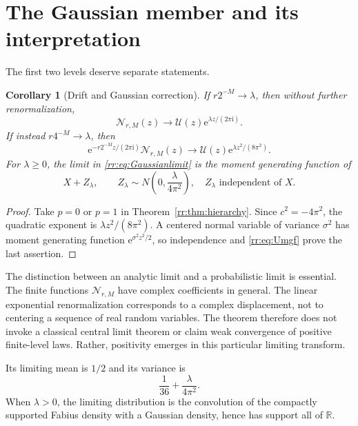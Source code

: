 \documentclass[11pt,a4paper,oneside,openany]{book}
\numberwithin{equation}{chapter}
\newtheorem{corollary}[theorem]{Corollary}
\theoremstyle{definition}
\theoremstyle{remark}
\newcommand{\R}{\mathbb R}
\newcommand{\e}{\mathrm e}
\newcommand{\ii}{\mathrm i}
\newcommand{\Up}{\mathcal U}
\newcommand{\Np}{\mathcal N}
\begin{document}
\section{The Gaussian member and its interpretation}
The first two levels deserve separate statements.

\begin{corollary}[Drift and Gaussian correction]
If \(r2^{-M}\to\lambda\), then without further renormalization,
\begin{equation}
 \Np_{r,M}(z)\longrightarrow\Up(z)\e^{\lambda z/(2\pi\ii)}.
 \label{rr:eq:driftlimit}
\end{equation}
If instead \(r4^{-M}\to\lambda\), then
\begin{equation}
 \e^{-r2^{-M}z/(2\pi\ii)}\Np_{r,M}(z)
 \longrightarrow\Up(z)\e^{\lambda z^2/(8\pi^2)}.
 \label{rr:eq:Gaussianlimit}
\end{equation}
For \(\lambda\geq0\), the limit in \eqref{rr:eq:Gaussianlimit} is the moment generating function of
\begin{equation}
 X+Z_\lambda,\qquad
 Z_\lambda\sim N\left(0,\frac{\lambda}{4\pi^2}\right),
 \quad Z_\lambda\text{ independent of }X.
 \label{rr:eq:Gaussianlaw}
\end{equation}
\end{corollary}
\begin{proof}
Take \(p=0\) or \(p=1\) in Theorem~\ref{rr:thm:hierarchy}. Since \(c^2=-4\pi^2\), the quadratic exponent is \(\lambda z^2/(8\pi^2)\). A centered normal variable of variance \(\sigma^2\) has moment generating function \(\e^{\sigma^2z^2/2}\), so independence and \eqref{rr:eq:Umgf} prove the last assertion.
\end{proof}

The distinction between an analytic limit and a probabilistic limit is essential. The finite functions \(\Np_{r,M}\) have complex coefficients in general. The linear exponential renormalization corresponds to a complex displacement, not to centering a sequence of real random variables. The theorem therefore does not invoke a classical central limit theorem or claim weak convergence of positive finite-level laws. Rather, positivity emerges in this particular limiting transform.

Its limiting mean is \(1/2\) and its variance is
\begin{equation}
 \frac1{36}+\frac{\lambda}{4\pi^2}.
\end{equation}
When \(\lambda>0\), the limiting distribution is the convolution of the compactly supported Fabius density with a Gaussian density, hence has support all of \(\R\).
\end{document}
